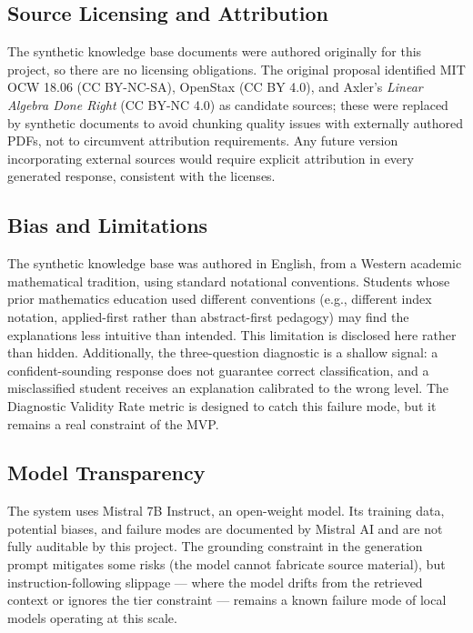\documentclass[11pt]{article}
\begin{document}
\subsection{Source Licensing and Attribution}

The synthetic knowledge base documents were authored originally for this project, so there are no licensing obligations. The original proposal identified MIT OCW 18.06 (CC BY-NC-SA), OpenStax (CC BY 4.0), and Axler's \textit{Linear Algebra Done Right} (CC BY-NC 4.0) as candidate sources; these were replaced by synthetic documents to avoid chunking quality issues with externally authored PDFs, not to circumvent attribution requirements. Any future version incorporating external sources would require explicit attribution in every generated response, consistent with the licenses.

\subsection{Bias and Limitations}

The synthetic knowledge base was authored in English, from a Western academic mathematical tradition, using standard notational conventions. Students whose prior mathematics education used different conventions (e.g., different index notation, applied-first rather than abstract-first pedagogy) may find the explanations less intuitive than intended. This limitation is disclosed here rather than hidden. Additionally, the three-question diagnostic is a shallow signal: a confident-sounding response does not guarantee correct classification, and a misclassified student receives an explanation calibrated to the wrong level. The Diagnostic Validity Rate metric is designed to catch this failure mode, but it remains a real constraint of the MVP.

\subsection{Model Transparency}

The system uses Mistral 7B Instruct, an open-weight model. Its training data, potential biases, and failure modes are documented by Mistral AI and are not fully auditable by this project. The grounding constraint in the generation prompt mitigates some risks (the model cannot fabricate source material), but instruction-following slippage --- where the model drifts from the retrieved context or ignores the tier constraint --- remains a known failure mode of local models operating at this scale.
\end{document}
